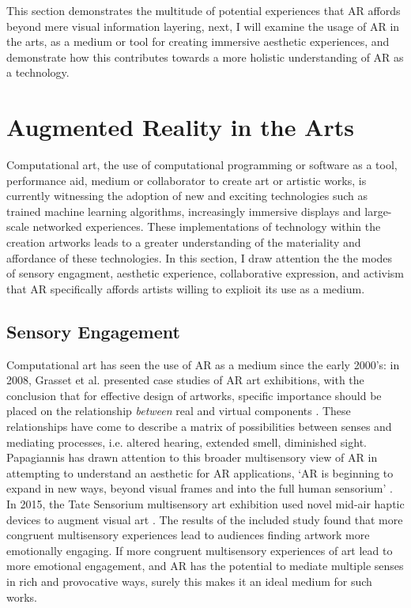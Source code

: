  This section demonstrates the multitude of potential experiences that AR affords beyond mere visual information layering, next, I will examine the usage of AR in the arts, as a medium or tool for creating immersive aesthetic experiences, and demonstrate how this contributes towards a more holistic understanding of AR as a technology. 



\section{Augmented Reality in the Arts}\label{sec: literature-arts}
Computational art, the use of computational programming or software as a tool, performance aid, medium or collaborator to create art or artistic works, is currently witnessing the adoption of new and exciting technologies such as trained machine learning algorithms, increasingly immersive displays and large-scale networked experiences. These implementations of technology within the creation artworks leads to a greater understanding of the materiality and affordance of these technologies. In this section, I draw attention the the modes of sensory engagment, aesthetic experience, collaborative expression, and activism that AR specifically affords artists willing to explioit its use as a medium.

\subsection{Sensory Engagement}\label{sec: literature-arts-sensory}
Computational art has seen the use of AR as a medium since the early 2000’s: in 2008, Grasset et al. presented case studies of AR art exhibitions, with the conclusion that for effective design of artworks, specific importance should be placed on the relationship \textit{between} real and virtual components \citeyearpar{grasset2008}. These relationships have come to describe a matrix of possibilities between senses and mediating processes, i.e. altered hearing, extended smell, diminished sight. Papagiannis has drawn attention to this broader multisensory view of AR in attempting to understand an aesthetic for AR applications, `AR is beginning to expand in new ways, beyond visual frames and into the full human sensorium' \citeyearpar{papagiannis2014}. In 2015, the Tate Sensorium multisensory art exhibition used novel mid-air haptic devices to augment visual art \citep{vi2017a}. The results of the included study found that more congruent multisensory experiences lead to audiences finding artwork more emotionally engaging. If more congruent multisensory experiences of art lead to more emotional engagement, and AR has the potential to mediate multiple senses in rich and provocative ways, surely this makes it an ideal medium for such works. 

